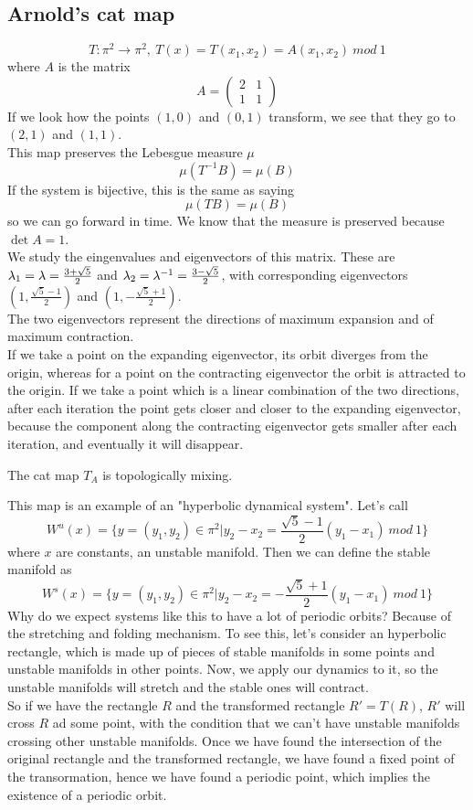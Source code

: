 \subsection{Arnold's cat map}
$$
	T : \pi^2 \rightarrow \pi^2, \ T(x) = T(x_1,x_2) = A (x_1,x_2) \ mod \ 1
$$
where $A$ is the matrix
$$
	A = \begin{pmatrix}
		2 & 1 \\
		1 & 1
	\end{pmatrix}
$$
If we look how the points $(1,0)$ and $(0,1)$ transform, we see that they go to $(2,1)$ and $(1,1)$. \\
This map preserves the Lebesgue measure $\mu$
$$
	\mu(T^{-1}B) = \mu(B)
$$
If the system is bijective, this is the same as saying
$$
	\mu(TB) = \mu(B)
$$
so we can go forward in time. We know that the measure is preserved because $\det A = 1$. \\
We study the eingenvalues and eigenvectors of this matrix. These are $\lambda_1 = \lambda = \frac{3+\sqrt{5}}{2}$ and $\lambda_2 = \lambda^{-1} = \frac{3-\sqrt{5}}{2}$, with corresponding eigenvectors $(1,\frac{\sqrt{5}-1}{2})$ and $(1,-\frac{\sqrt{5}+1}{2})$. \\
The two eigenvectors represent the directions of maximum expansion and of maximum contraction. \\
If we take a point on the expanding eigenvector, its orbit diverges from the origin, whereas for a point on the contracting eigenvector the orbit is attracted to the origin. If we take a point which is a linear combination of the two directions, after each iteration the point gets closer and closer to the expanding eigenvector, because the component along the contracting eigenvector gets smaller after each iteration, and eventually it will disappear.
\begin{prop}
	The cat map $T_A$ is topologically mixing.	
\end{prop}
This map is an example of an "hyperbolic dynamical system". Let's call 
$$
	W^u(x) = \{y=(y_1,y_2)\in \pi^2| y_2-x_2 = \frac{\sqrt{5}-1}{2}(y_1-x_1) \ mod \ 1\}
$$
where $x$ are constants, an unstable manifold. Then we can define the stable manifold as
$$
	W^s(x) = \{y=(y_1,y_2)\in \pi^2| y_2-x_2 = -\frac{\sqrt{5}+1}{2}(y_1-x_1) \ mod \ 1\}
$$
Why do we expect systems like this to have a lot of periodic orbits?
Because of the stretching and folding mechanism. To see this, let's consider an hyperbolic rectangle, which is made up of pieces of stable manifolds in some points and unstable manifolds in other points. Now, we apply our dynamics to it, so the unstable manifolds will stretch and the stable ones will contract. \\
So if we have the rectangle $R$ and the transformed rectangle $R'=T(R)$, $R'$ will cross $R$ ad some point, with the condition that we can't have unstable manifolds crossing other unstable manifolds. Once we have found the intersection of the original rectangle and the transformed rectangle, we have found a fixed point of the transormation, hence we have found a periodic point, which implies the existence of a periodic orbit.







